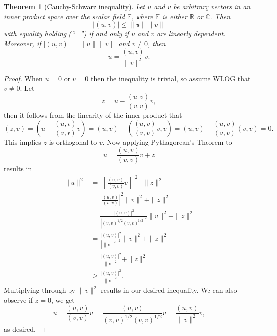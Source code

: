\documentclass[11pt]{article}
\newtheorem{theorem}{Theorem}
\theoremstyle{definition}
\begin{document}
\begin{theorem}[Cauchy-Schwarz inequality]
	Let $u$ and $v$ be arbitrary vectors in an inner product space over the scalar field $\mathbb{F}$,
	where $\mathbb{F}$ is either $\mathbb{R}$ or $\mathbb{C}$. Then
	\begin{equation*}
		|(u,v)| \leq \|u\|\|v\|
	\end{equation*}
	with equality holding (``='') if and only if $u$ and $v$ are linearly dependent.
	Moreover, if $|(u,v)| = \|u\|\|v\|$ and $v\not=0$, then
	\begin{equation*}
		u = \frac{(u,v)}{\|v\|^2}v.
	\end{equation*}
\end{theorem}
\begin{proof}
	When $u=0$ or $v=0$ then the inequality is trivial, so assume WLOG that $v\not=0$.
	Let
	\begin{equation*}
		z = u - \frac{(u,v)}{(v,v)}v,
	\end{equation*}
	then it follows from the linearity of the inner product that
	\begin{equation*}
		(z,v) = \left(u - \frac{(u,v)}{(v,v)}v\right) = (u,v) - \left(\frac{(u,v)}{(v,v)}v,v\right) = (u,v) - \frac{(u,v)}{(v,v)}(v,v) = 0.
	\end{equation*}
	This implies $z$ is orthogonal to $v$. Now applying Pythagorean's Theorem to
	\begin{equation*}
		u = \frac{(u,v)}{(v,v)}v + z
	\end{equation*}
	results in
	\begin{equation*}
		\begin{aligned}
			\|u\|^2 &= \left\|\frac{(u,v)}{(v,v)}v\right\|^2 + \|z\|^2 \\
				&= \left|\frac{(u,v)}{(v,v)}\right|^2 \|v\|^2 + \|z\|^2 \\
				&= \frac{|(u,v)|^2}{|(v,v)^{1/2}(v,v)^{1/2}|^2}\|v\|^2 + \|z\|^2 \\
				&= \frac{|(u,v)|^2}{|\|v\|^2|^2}\|v\|^2 + \|z\|^2 \\
				&= \frac{|(u,v)|^2}{\|v\|^2} + \|z\|^2 \\
				&\geq \frac{|(u,v)|^2}{\|v\|^2}.
		\end{aligned}
	\end{equation*}
	Multiplying through by $\|v\|^2$ results in our desired inequality. We can also observe if $z=0$, we get
	\begin{equation*}
		u = \frac{(u,v)}{(v,v)}v = \frac{(u,v)}{(v,v)^{1/2}(v,v)^{1/2}}v = \frac{(u,v)}{\|v\|^2}v,
	\end{equation*}
	as desired.
\end{proof}
\end{document}
